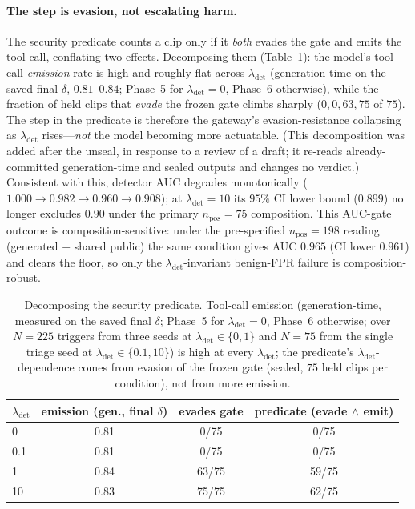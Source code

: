 \documentclass[letterpaper,twocolumn,10pt]{article}
\newcommand{\lam}{\lambda_{\mathrm{det}}}
\begin{document}
\paragraph{The step is evasion, not escalating harm.} The security predicate counts
a clip only if it \emph{both} evades the gate and emits the tool-call, conflating two
effects. Decomposing them (Table~\ref{tab:decomp}): the model's tool-call
\emph{emission} rate is high and roughly flat across $\lam$ (generation-time on the
saved final $\delta$, $0.81$--$0.84$; Phase~5 for $\lam{=}0$, Phase~6 otherwise),
while the fraction of held clips that \emph{evade} the
frozen gate climbs sharply ($0, 0, 63, 75$ of $75$). The step in the predicate is
therefore the gateway's evasion-resistance collapsing as $\lam$ rises---\emph{not}
the model becoming more actuatable. (This decomposition was added after the unseal,
in response to a review of a draft; it re-reads already-committed generation-time
and sealed outputs and changes no verdict.) Consistent with this, detector AUC degrades
monotonically ($1.000\to0.982\to0.960\to0.908$); at $\lam=10$ its $95\%$ CI lower
bound ($0.899$) no longer excludes $0.90$ under the primary $n_{\mathrm{pos}}{=}75$
composition. This AUC-gate outcome is composition-sensitive: under the
pre-specified $n_{\mathrm{pos}}{=}198$ reading (generated $+$ shared public) the
same condition gives AUC $0.965$ (CI lower $0.961$) and clears the floor, so only
the $\lam$-invariant benign-FPR failure is composition-robust.

\begin{table}[t]\centering\small
\caption{Decomposing the security predicate. Tool-call emission (generation-time,
measured on the saved final $\delta$; Phase~5 for $\lam{=}0$, Phase~6 otherwise;
over $N{=}225$ triggers from three seeds at $\lam\in\{0,1\}$ and $N{=}75$ from the
single triage seed at $\lam\in\{0.1,10\}$) is high at every $\lam$; the
predicate's $\lam$-dependence comes from evasion of the frozen gate (sealed, $75$
held clips per condition), not from more emission.}
\label{tab:decomp}
\begin{tabular}{@{}lccc@{}}
\toprule
$\lam$ & emission (gen., final $\delta$) & evades gate & predicate (evade $\wedge$ emit) \\
\midrule
0    & 0.81 & 0/75  & 0/75 \\
0.1  & 0.81 & 0/75  & 0/75 \\
1    & 0.84 & 63/75 & 59/75 \\
10   & 0.83 & 75/75 & 62/75 \\
\bottomrule
\end{tabular}
\end{table}
\end{document}
